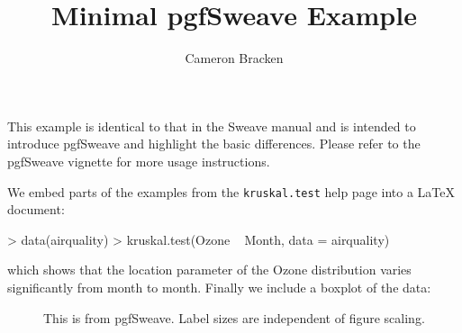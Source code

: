 \documentclass{article}
\title{Minimal pgfSweave Example}
\author{Cameron Bracken}
\begin{document}
\maketitle
This example is identical to that in the Sweave manual and is intended to 
introduce pgfSweave and highlight the basic differences.  Please refer to 
the pgfSweave vignette for more usage instructions. 

We embed parts of the examples from the \texttt{kruskal.test} help page 
into a \LaTeX{} document:

\begin{Schunk}
\begin{Sinput}
> data(airquality)
> kruskal.test(Ozone ~ Month, data = airquality)
\end{Sinput}
\end{Schunk}
which shows that the location parameter of the Ozone distribution varies 
significantly from month to month. Finally we include a boxplot of the data:


\begin{figure}[!ht]
\centering

\endpgfgraphicnamed
\caption{This is from pgfSweave. Label sizes are independent of figure scaling.}
\end{figure}
\end{document}
